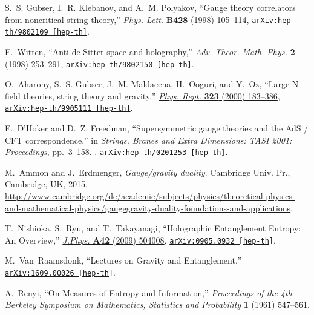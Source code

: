 \begin{thebibliography}{100}
S.~S. Gubser, I.~R. Klebanov, and A.~M. Polyakov, ``{Gauge theory correlators
  from noncritical string theory},''
  \href{http://dx.doi.org/10.1016/S0370-2693(98)00377-3}{{\em Phys. Lett.} {\bf
  B428} (1998)  105--114},
\href{http://arxiv.org/abs/hep-th/9802109}{{\tt arXiv:hep-th/9802109
  [hep-th]}}.

E.~Witten, ``{Anti-de Sitter space and holography},'' {\em Adv. Theor. Math.
  Phys.} {\bf 2} (1998)  253--291,
\href{http://arxiv.org/abs/hep-th/9802150}{{\tt arXiv:hep-th/9802150
  [hep-th]}}.

O.~Aharony, S.~S. Gubser, J.~M. Maldacena, H.~Ooguri, and Y.~Oz, ``{Large N
  field theories, string theory and gravity},''
  \href{http://dx.doi.org/10.1016/S0370-1573(99)00083-6}{{\em Phys. Rept.} {\bf
  323} (2000)  183--386},
\href{http://arxiv.org/abs/hep-th/9905111}{{\tt arXiv:hep-th/9905111
  [hep-th]}}.

E.~D'Hoker and D.~Z. Freedman, ``{Supersymmetric gauge theories and the AdS /
  CFT correspondence},'' in {\em {Strings, Branes and Extra Dimensions: TASI
  2001: Proceedings}}, pp.~3--158.
.
\newblock
\href{http://arxiv.org/abs/hep-th/0201253}{{\tt arXiv:hep-th/0201253
  [hep-th]}}.
\newblock

M.~Ammon and J.~Erdmenger, {\em {Gauge/gravity duality}}.
\newblock Cambridge Univ. Pr., Cambridge, UK, 2015.
\newblock
\url{http://www.cambridge.org/de/academic/subjects/physics/theoretical-physics-and-mathematical-physics/gaugegravity-duality-foundations-and-applications}.
\newblock

T.~Nishioka, S.~Ryu, and T.~Takayanagi, ``{Holographic Entanglement Entropy: An
  Overview},'' \href{http://dx.doi.org/10.1088/1751-8113/42/50/504008}{{\em
  J.Phys.} {\bf A42} (2009)  504008},
\href{http://arxiv.org/abs/0905.0932}{{\tt arXiv:0905.0932 [hep-th]}}.

M.~Van~Raamsdonk, ``{Lectures on Gravity and Entanglement},''
\href{http://arxiv.org/abs/1609.00026}{{\tt arXiv:1609.00026 [hep-th]}}.

A.~Renyi, ``{On Measures of Entropy and Information},'' {\em Proceedings of the
  4th Berkeley Symposium on Mathematics, Statistics and Probability} {\bf 1}
  (1961)  547--561.


\end{thebibliography}
